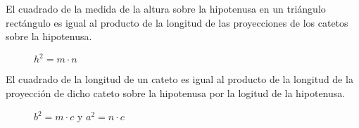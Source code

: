 \begin{theorem}
    El cuadrado de la medida de la altura sobre la hipotenusa en un triángulo rectángulo es igual al producto de la longitud de las proyecciones de los catetos sobre la hipotenusa.

    \begin{figure}[!h]
        \centering
        
        \caption{$h^2 = m \cdot n$}
        \label{fig:projection-hypothenuse-theorem}
    \end{figure}    
    
\end{theorem}

\clearpage

\begin{theorem}
    El cuadrado de la longitud de un cateto es igual al producto de la longitud de la proyección de dicho cateto sobre la hipotenusa por la logitud de la hipotenusa.

    \begin{figure}[!h]
        \centering
        
        \caption{$b^2 = m \cdot c$ y $a^2 = n \cdot c$}
        \label{fig:theorem-leg-hypothenuse-projection}
    \end{figure}    
    
\end{theorem}